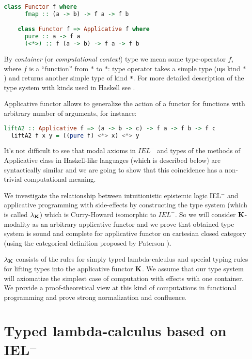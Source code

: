 \documentclass[a4paper]{article}
\begin{document}
  \begin{lstlisting}[language=Haskell]
    class Functor f where
      fmap :: (a -> b) -> f a -> f b

    class Functor f => Applicative f where
      pure :: a -> f a
      (<*>) :: f (a -> b) -> f a -> f b
  \end{lstlisting}

  By \emph{container} (or \emph{computational context}) type we mean some type-operator $f$, where $f$ is a
  ``function'' from $*$ to $*$: type operator takes a simple type (ща kind $*$) and returns another
  simple type of kind \verb"*". For more detailed description of the type system with kinds used in
  Haskell see \cite{Morten}.

Applicative functor allows to generalize the action of a functor for functions with arbitrary number of arguments, for instance:
  \begin{lstlisting}[language=Haskell]
  liftA2 :: Applicative f => (a -> b -> c) -> f a -> f b -> f c
  liftA2 f x y = ((pure f) <*> x) <*> y
  \end{lstlisting}

  It's not difficult to see that modal axioms in $IEL^{-}$ and types of the methods of Applicative class in
  Haskell-like languages (which is described below) are syntactically similar and we are going to show that
  this coincidence has a non-trivial computational meaning.

  We investigate the relationship between intuitionistic epistemic logic IEL$^{-}$ and applicative programming with side-effects
  by constructing the type system (which is called $\lambda_{{\bf K}}$) which is Curry-Howard isomorphic to $IEL^{-}$.
  So we will consider ${\bf K}$-modality as an arbitrary applicative functor and we prove that obtained type system
  is sound and complete for applicative functor on cartesian closed category (using the categorical definition proposed by Paterson \cite{Cons}).

  $\lambda_{{\bf K}}$ consists of the rules for simply typed lambda-calculus and special typing rules for
  lifting types into the applicative functor ${\bf K}$. We assume that our type system will
  axiomatize the simplest case of computation with effects with one container. We provide a proof-theoretical
  view at this kind of computations in functional programming and prove strong normalization and confluence.

  \section{Typed lambda-calculus based on IEL$^{-}$}
\end{document}
